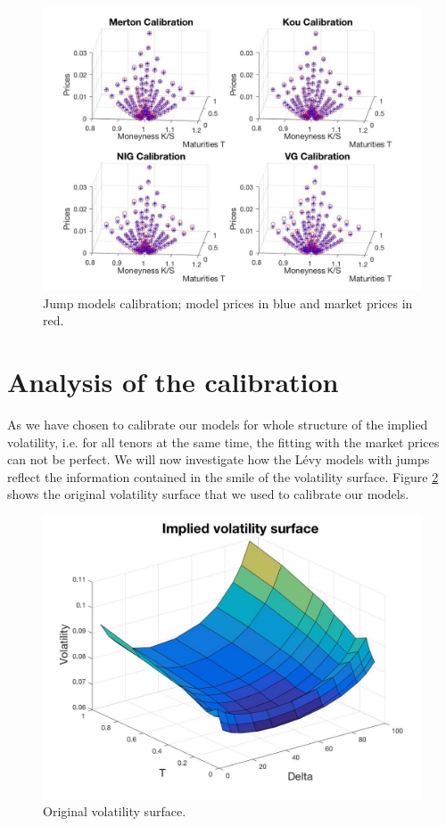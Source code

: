 \begin{figure}[!htb]
\centering
	\includegraphics[width=\textwidth]{gfx/Jump-calibration}
	\caption{Jump models calibration; model prices in blue and market prices in red.}
	\label{fig:calibration:jump-prices}
\end{figure}

\section{Analysis of the calibration}
\label{sec:calibration:analysis}
As we have chosen to calibrate our models for whole structure of the implied volatility, i.e. for all tenors at the same time, the fitting with the market prices can not be perfect. We will now investigate how the L\'evy models with jumps reflect the information contained in the smile of the volatility surface. Figure \ref{fig:vol_surf} shows the original volatility surface that we used to calibrate our models.
\begin{figure}[!htb]
\centering
	\includegraphics[scale = 0.2]{gfx/vol_surf}
	\caption{Original volatility surface.}
	\label{fig:vol_surf}
\end{figure}

